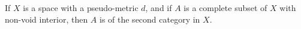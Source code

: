 If $X$ is a space with a pseudo-metric $d$, and if $A$ is a complete subset of $X$ with non-void interior, then $A$ is of the second category in $X$.
